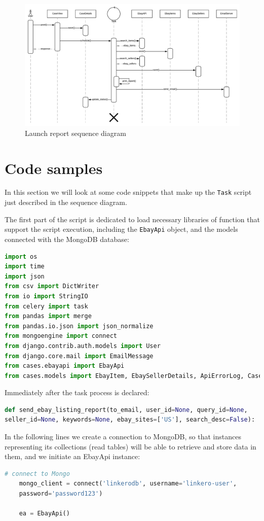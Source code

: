 \begin{figure}[H]
\centering
\includegraphics[angle=90, scale=0.6]{imgs/SequenceDiagram.pdf}
\caption{Launch report sequence diagram}
\label{fig:sqncdiag}
\end{figure}

\section{Code samples}
In this section we will look at some code snippets that make up the
\texttt{Task} script just described in the sequence diagram.

The first part of the script is dedicated to load necessary libraries of
function that support the script execution, including the \texttt{EbayApi}
object, and the models connected with the MongoDB database:
\begin{lstlisting}[language=Python, breaklines=true]
import os
import time
import json
from csv import DictWriter
from io import StringIO
from celery import task
from pandas import merge
from pandas.io.json import json_normalize
from mongoengine import connect
from django.contrib.auth.models import User
from django.core.mail import EmailMessage
from cases.ebayapi import EbayApi
from cases.models import EbayItem, EbaySellerDetails, ApiErrorLog, CaseDetails
\end{lstlisting}

Immediately after the task process is declared:
\begin{lstlisting}[language=Python, breaklines=true]
def send_ebay_listing_report(to_email, user_id=None, query_id=None,
seller_id=None, keywords=None, ebay_sites=['US'], search_desc=False):
\end{lstlisting}

In the following lines we create a connection to MongoDB, so that instances
representing its collections (read tables) will be able to retrieve and store
data in them, and we initiate an EbayApi instance:
\begin{lstlisting}[language=Python, breaklines=true]
    # connect to Mongo
    mongo_client = connect('linkerodb', username='linkero-user',
    password='password123')
        
    ea = EbayApi()
\end{lstlisting}

